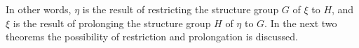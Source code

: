 In other words, $\eta$ is the result of restricting the structure group $G$ of $\xi$ to $H$, and $\xi$ is the result of prolonging the structure group $H$ of $\eta$ to $G$. In the next two theorems the possibility of restriction and prolongation is discussed.
